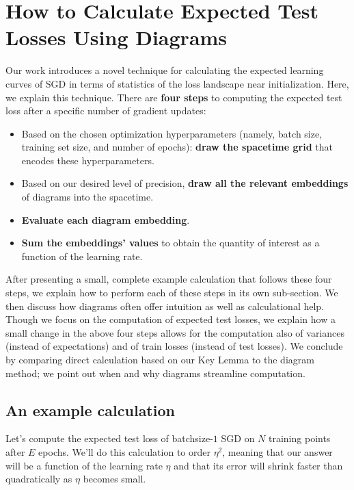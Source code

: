 \documentclass{article}
\theoremstyle{plain}
\theoremstyle{definition}
\begin{document}
\section{How to Calculate Expected Test Losses Using Diagrams}
    Our work introduces a novel technique for calculating the expected learning
    curves of SGD in terms of statistics of the loss landscape near
    initialization.  Here, we explain this technique.  There are {\bf four
    steps} to computing the expected test loss after a specific number of
    gradient updates: 
    \begin{itemize}
        \item Based on the chosen optimization hyperparameters (namely, batch
              size, training set size, and number of epochs):
              {\bf draw the spacetime grid} that encodes these hyperparameters.
        \item Based on our desired level of precision,
              {\bf draw all the relevant embeddings} of diagrams into the
              spacetime.
        \item {\bf Evaluate each diagram embedding}.
        \item {\bf Sum the embeddings' values} to obtain the quantity of
              interest as a function of the learning rate.
    \end{itemize}

    After presenting a small, complete example calculation that follows these
    four steps, we explain how to perform each of these steps in its own
    sub-section.  We then discuss how diagrams often offer intuition as well as
    calculational help.  Though we focus on the computation of expected test
    losses, we explain how a small change in the above four steps allows for
    the computation also of variances (instead of expectations) and of train
    losses (instead of test losses).  We conclude by comparing direct
    calculation based on our Key Lemma to the diagram method; we point out when
    and why diagrams streamline computation.

    \subsection{An example calculation}                             %
        Let's compute the expected test loss of batchsize-$1$ SGD on $N$
        training points after $E$ epochs.  We'll do this calculation to order
        $\eta^2$, meaning that our answer will be a function of the learning
        rate $\eta$ and that its error will shrink faster than quadratically as
        $\eta$ becomes small. 
\end{document}
